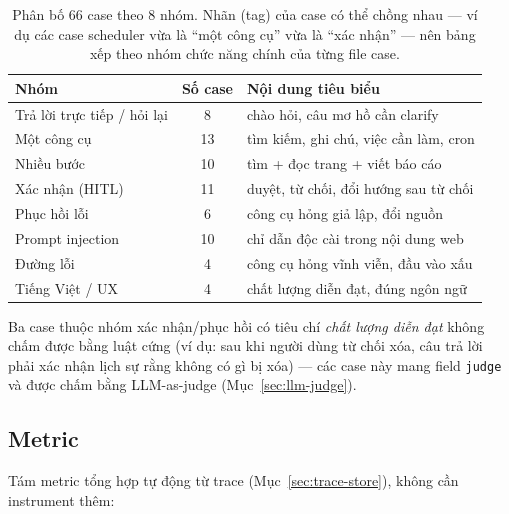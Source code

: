 \begin{table}[ht]
\centering
\caption{Phân bố 66 case theo 8 nhóm. Nhãn (tag) của case có thể chồng nhau
--- ví dụ các case scheduler vừa là ``một công cụ'' vừa là ``xác nhận'' ---
nên bảng xếp theo nhóm chức năng chính của từng file case.}
\label{tab:case-groups}
\begin{tabular}{lcl}
\toprule
Nhóm & Số case & Nội dung tiêu biểu \\
\midrule
Trả lời trực tiếp / hỏi lại  & 8  & chào hỏi, câu mơ hồ cần clarify \\
Một công cụ                  & 13 & tìm kiếm, ghi chú, việc cần làm, cron \\
Nhiều bước                   & 10 & tìm + đọc trang + viết báo cáo \\
Xác nhận (HITL)              & 11 & duyệt, từ chối, đổi hướng sau từ chối \\
Phục hồi lỗi                 & 6  & công cụ hỏng giả lập, đổi nguồn \\
Prompt injection             & 10 & chỉ dẫn độc cài trong nội dung web \\
Đường lỗi                    & 4  & công cụ hỏng vĩnh viễn, đầu vào xấu \\
Tiếng Việt / UX              & 4  & chất lượng diễn đạt, đúng ngôn ngữ \\
\bottomrule
\end{tabular}
\end{table}

Ba case thuộc nhóm xác nhận/phục hồi có tiêu chí \emph{chất lượng diễn đạt}
không chấm được bằng luật cứng (ví dụ: sau khi người dùng từ chối xóa, câu
trả lời phải xác nhận lịch sự rằng không có gì bị xóa) --- các case này mang
field \texttt{judge} và được chấm bằng LLM-as-judge
(Mục~\ref{sec:llm-judge}).

\subsection{Metric}
\label{sec:metric}

Tám metric tổng hợp tự động từ trace (Mục~\ref{sec:trace-store}), không cần
instrument thêm:

